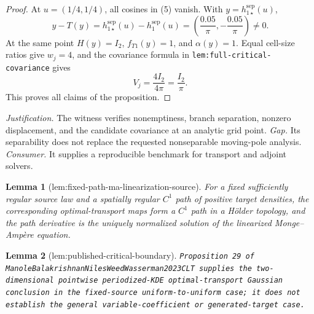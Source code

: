\documentclass{article}
\newtheorem{lemma}{Lemma}
\begin{document}
\begin{proof}
At \(u=(1/4,1/4)\), all cosines in (5) vanish.  With \(y=h_{1\star}^{\mathrm{sep}}(u)\),
\[
 y-T(y)=h_{1\star}^{\mathrm{sep}}(u)-h_1^{\mathrm{sep}}(u)
 =\left(\frac{0.05}{\pi},-\frac{0.05}{\pi}\right)\neq0.             \tag{8}
\]
At the same point \(H(y)=I_2\), \(f_{T1}(y)=1\), and \(\alpha(y)=1\).  Equal cell-size ratios give \(w_j=4\), and the covariance formula in \texttt{lem:full-critical-covariance} gives
\[
 V_j=\frac{4I_2}{4\pi}=\frac{I_2}{\pi}.                              \tag{9}
\]
This proves all claims of the proposition.
\end{proof}
\par\smallskip\noindent \textit{Justification.} The witness verifies nonemptiness, branch separation, nonzero displacement, and the candidate covariance at an analytic grid point. \textit{Gap.} Its separability does not replace the requested nonseparable moving-pole analysis. \textit{Consumer.} It supplies a reproducible benchmark for transport and adjoint solvers.

\begin{lemma}[lem:fixed-path-ma-linearization-source]\label{lem:fixed-path-ma-linearization-source}
For a fixed sufficiently regular source law and a spatially regular \(C^1\) path of positive target densities, the corresponding optimal-transport maps form a \(C^1\) path in a H\"older topology, and the path derivative is the uniquely normalized solution of the linearized Monge--Amp\`ere equation.
\end{lemma}

\begin{lemma}[lem:published-critical-boundary]\label{lem:published-critical-boundary}
\texttt{Proposition 29 of ManoleBalakrishnanNilesWeedWasserman2023CLT supplies the two-\allowbreak{}dimensional pointwise periodized-\allowbreak{}KDE optimal-\allowbreak{}transport Gaussian conclusion in the fixed-\allowbreak{}source uniform-\allowbreak{}to-\allowbreak{}uniform case;\allowbreak{} it does not establish the general variable-\allowbreak{}coefficient or generated-\allowbreak{}target case.}
\end{lemma}
\end{document}
